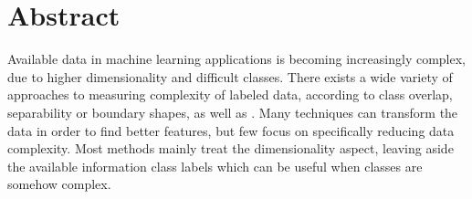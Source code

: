 





  \section*{Abstract}
    Available data in machine learning applications is becoming increasingly complex, due to higher dimensionality and difficult classes. There exists a wide variety of approaches to measuring complexity of labeled data, according to class overlap, separability or boundary shapes, as well as . Many techniques can transform the data in order to find better features, but few focus on specifically reducing data complexity. Most  methods mainly treat the dimensionality aspect, leaving aside the available information  class labels which can be useful when classes are somehow complex.

